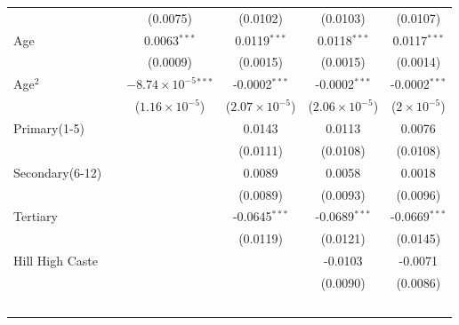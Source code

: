 \begin{tabular}{lccccc}
                                               &                               & (0.0075)                       & (0.0102)                & (0.0103)                & (0.0107)\\   
   Age                                         &                               & 0.0063$^{***}$                 & 0.0119$^{***}$          & 0.0118$^{***}$          & 0.0117$^{***}$\\   
                                               &                               & (0.0009)                       & (0.0015)                & (0.0015)                & (0.0014)\\   
   Age$^2$                                &                               & $-8.74\times 10^{-5}$$^{***}$  & -0.0002$^{***}$         & -0.0002$^{***}$         & -0.0002$^{***}$\\   
                                               &                               & ($1.16\times 10^{-5}$)         & ($2.07\times 10^{-5}$)  & ($2.06\times 10^{-5}$)  & ($2\times 10^{-5}$)\\    
   Primary(1-5)     &                               &                                & 0.0143                  & 0.0113                  & 0.0076\\   
                                               &                               &                                & (0.0111)                & (0.0108)                & (0.0108)\\   
   Secondary(6-12)  &                               &                                & 0.0089                  & 0.0058                  & 0.0018\\   
                                               &                               &                                & (0.0089)                & (0.0093)                & (0.0096)\\   
   Tertiary         &                               &                                & -0.0645$^{***}$         & -0.0689$^{***}$         & -0.0669$^{***}$\\   
                                               &                               &                                & (0.0119)                & (0.0121)                & (0.0145)\\   
   Hill High Caste              &                               &                                &                         & -0.0103                 & -0.0071\\   
                                               &                               &                                &                         & (0.0090)                & (0.0086)\\   
$$
\end{tabular}

